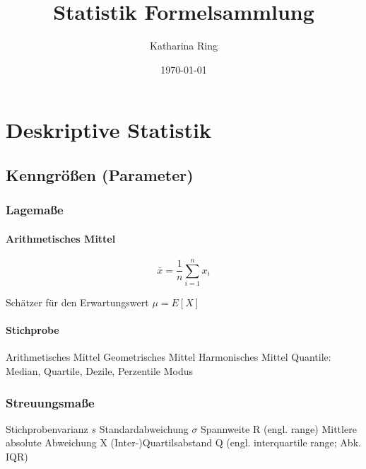 \documentclass[10pt]{article}
\begin{document}
\title{Statistik Formelsammlung}
\author{Katharina Ring}
\date{\today}
\maketitle

\clearpage

\tableofcontents

\clearpage




\section{Deskriptive Statistik}

\subsection{Kenngrößen (Parameter)}
\subsubsection{Lagemaße}
\begin{multicols}{2}

\paragraph{Arithmetisches Mittel}

 $$\bar{x}=\frac{1}{n}\sum\limits_{i=1}^n x_i$$

\noindent Schätzer für den Erwartungswert 
$\mu = E[X]$


\paragraph{Stichprobe}

    Arithmetisches Mittel
    Geometrisches Mittel
    Harmonisches Mittel
    Quantile: Median, Quartile, Dezile, Perzentile
    Modus
\end{multicols}
\subsubsection{Streuungsmaße}



    Stichprobenvarianz $s$
    Standardabweichung $\sigma$
    Spannweite R (engl. range)
    Mittlere absolute Abweichung X
    (Inter-)Quartilsabstand Q (engl. interquartile range; Abk. IQR)
\end{document}
